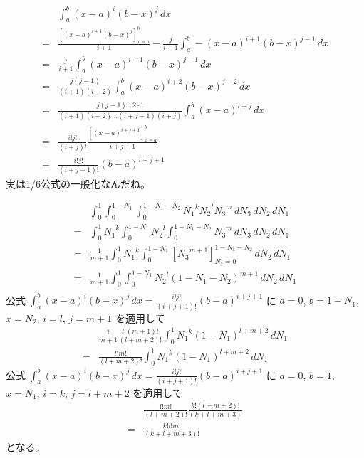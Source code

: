 \begin{align}
&\int_a^b\left(x-a\right)^i\left(b-x\right)^j\,dx\\
=&\frac{\left[\left(x-a\right)^{i+1}\left(b-x\right)^j\right]_{x=a}^{b}}{i+1}
 - \frac{j}{i+1}\int_a^b-\left(x-a\right)^{i+1}\left(b-x\right)^{j-1}\,dx\\
=&\frac{j}{i+1}\int_a^b\left(x-a\right)^{i+1}\left(b-x\right)^{j-1}\,dx\\
=&\frac{j\left(j-1\right)}{\left(i+1\right)\left(i+2\right)}
  \int_a^b\left(x-a\right)^{i+2}\left(b-x\right)^{j-2}\,dx\\
=&\frac{j\left(j-1\right)\ldots2\cdot1}
       {\left(i+1\right)\left(i+2\right)
        \ldots\left(i+j-1\right)\left(i+j\right)}
  \int_a^b\left(x-a\right)^{i+j}\,dx\\
=&\frac{i!j!}{\left(i+j\right)!}
  \frac{\left[\left(x-a\right)^{i+j+1}\right]_{x=a}^b}
       {i+j+1}\\
=&\frac{i!j!}{\left(i+j+1\right)!}\left(b-a\right)^{i+j+1}
\end{align}
実は1/6公式の一般化なんだね。

\begin{align}
&\int_0^1\int_0^{1-N_1}\int_0^{1-N_1-N_2}
{N_1}^k{N_2}^l{N_3}^m
\,dN_3\,dN_2\,dN_1\\
=&
\int_0^1{N_1}^k\int_0^{1-N_1}{N_2}^l\int_0^{1-N_1-N_2}{N_3}^m
\,dN_3\,dN_2\,dN_1\\
=&
\frac{1}{m+1}
\int_0^1{N_1}^k\int_0^{1-N_1}
\left[{N_3}^{m+1}\right]_{N_3=0}^{1-N_1-N_2}
\,dN_2\,dN_1\\
=&\frac{1}{m+1}
\int_0^1\int_0^{1-N_1}
{N_2}^l\left(1-N_1-N_2\right)^{m+1}
\,dN_2\,dN_1\\
\end{align}
公式
$\displaystyle\int_a^b\left(x-a\right)^i\left(b-x\right)^j\,dx
=\frac{i!j!}{\left(i+j+1\right)!}\left(b-a\right)^{i+j+1}$
に
$a=0$, $b=1-N_1$, $x=N_2$, $i=l$, $j=m+1$
を適用して
\begin{align}
&\frac{1}{m+1}\frac{l!\left(m+1\right)!}{\left(l+m+2\right)!}
\int_0^1{N_1}^k
\left(1-N_1\right)^{l+m+2}
\,dN_1\\
=&\frac{l!m!}{\left(l+m+2\right)!}
\int_0^1{N_1}^k
\left(1-N_1\right)^{l+m+2}
\,dN_1
\end{align}
公式
$\displaystyle\int_a^b\left(x-a\right)^i\left(b-x\right)^j\,dx
=\frac{i!j!}{\left(i+j+1\right)!}\left(b-a\right)^{i+j+1}$
に
$a=0$, $b=1$, $x=N_1$, $i=k$, $j=l+m+2$
を適用して
\begin{align}
&\frac{l!m!}{\left(l+m+2\right)!}
\frac{k!\left(l+m+2\right)!}
     {\left(k+l+m+3\right)}\\
=&\frac{k!l!m!}{\left(k+l+m+3\right)!}
\end{align}
となる。